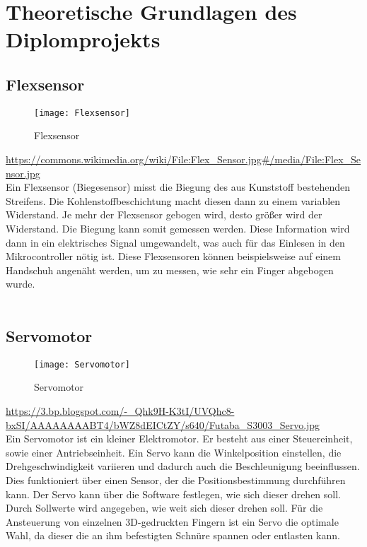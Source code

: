 \documentclass[titlepage,12pt,twoside]{article}
\begin{document}
\newpage
\section{Theoretische Grundlagen des Diplomprojekts}
\label{chap:Theoretische Grundlagen des Diplomprojekts}

\subsection{Flexsensor}
\label{chap:Flexsensor}
\begin{figure}[H]
	\begin{center}
		\scalebox{1.0}
		{\texttt{[image: Flexsensor]}}
		\caption{Flexsensor}
		\label{fig:Flexsensor}
	\end{center}
\end{figure}
\hfill \break
\textcolor{red}{\url{https://commons.wikimedia.org/wiki/File:Flex_Sensor.jpg\#/media/File:Flex_Sensor.jpg}} \\
Ein Flexsensor (Biegesensor) misst die Biegung des aus Kunststoff bestehenden 
Streifens. Die Kohlenstoffbeschichtung macht diesen dann zu einem variablen 
Widerstand. Je mehr der Flexsensor gebogen wird, desto größer wird der Widerstand. 
Die Biegung kann somit gemessen werden. Diese Information wird dann in ein 
elektrisches Signal umgewandelt, was auch für das Einlesen in den Mikrocontroller 
nötig ist. Diese Flexsensoren können beispielsweise auf einem Handschuh angenäht 
werden, um zu messen, wie sehr ein Finger abgebogen wurde. \\
\\

\subsection{Servomotor}
\label{chap:Servomotor}
\begin{figure}[H]
	\begin{center}
		\scalebox{1.0}
		{\texttt{[image: Servomotor]}}
		\caption{Servomotor}
		\label{fig:Servomotor}
	\end{center}
\end{figure}
\hfill \break
\textcolor{red}{\url{https://3.bp.blogspot.com/-_Qhk9H-K3tI/UVQhc8-bxSI/AAAAAAAABT4/bWZ8dEICtZY/s640/Futaba_S3003_Servo.jpg}} \\
Ein Servomotor ist ein kleiner Elektromotor. Er besteht aus einer Steuereinheit, 
sowie einer Antriebseinheit. Ein Servo kann die Winkelposition einstellen, die 
Drehgeschwindigkeit variieren und dadurch auch die Beschleunigung beeinflussen. 
Dies funktioniert über einen Sensor, der die Positionsbestimmung durchführen kann. 
Der Servo kann über die Software festlegen, wie sich dieser drehen soll. Durch 
Sollwerte wird angegeben, wie weit sich dieser drehen soll. Für die Ansteuerung 
von einzelnen 3D-gedruckten Fingern ist ein Servo die optimale Wahl, da dieser 
die an ihm befestigten Schnüre spannen oder entlasten kann. \\
\\
\end{document}
